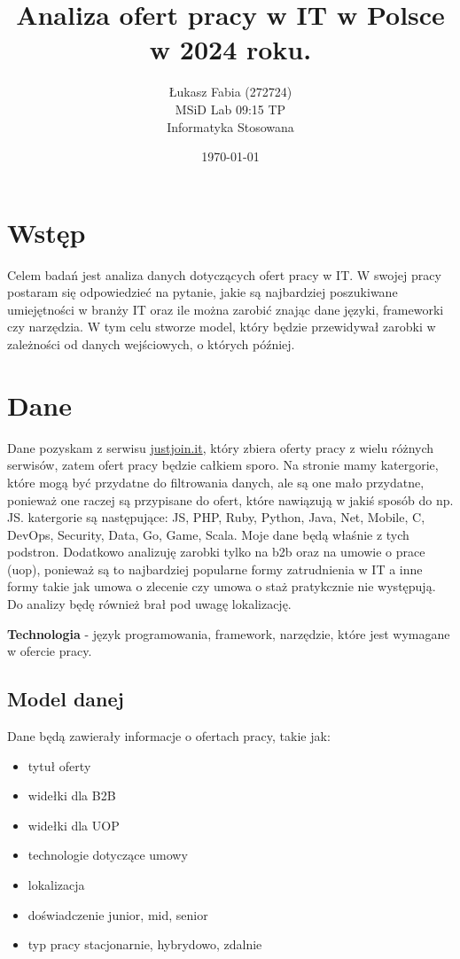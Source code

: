 \documentclass[a4paper]{article}
\title{Analiza ofert pracy w IT w Polsce w 2024 roku.}
\author{Łukasz Fabia (272724) \\ MSiD Lab 09:15 TP \\ Informatyka Stosowana}
\date{\today}
\begin{document}
\maketitle
\tableofcontents

\newpage

\section{Wstęp}

\quad Celem badań jest analiza danych dotyczących ofert pracy w IT. W swojej pracy postaram się
odpowiedzieć na pytanie, jakie są najbardziej poszukiwane umiejętności w branży IT oraz ile można zarobić
znając dane języki, frameworki czy narzędzia. W tym celu stworze model, który będzie przewidywał zarobki w zależności od danych wejściowych,
o których później.


\section{Dane}

\quad Dane pozyskam z serwisu \href{https://justjoin.it/}{justjoin.it}, który zbiera oferty pracy z wielu różnych serwisów, zatem
ofert pracy będzie całkiem sporo. Na stronie mamy katergorie, które mogą być przydatne do filtrowania danych, ale są one mało przydatne, ponieważ one raczej są przypisane do ofert, które nawiązują w jakiś sposób do np. JS. katergorie są następujące:
JS, PHP, Ruby, Python, Java, Net, Mobile, C, DevOps, Security, Data, Go, Game, Scala. Moje dane będą właśnie z tych podstron.
\quad Dodatkowo analizuję zarobki tylko na b2b oraz na umowie o prace (uop), ponieważ są to najbardziej popularne formy zatrudnienia w IT a inne formy takie jak umowa o zlecenie czy umowa o staż pratykcznie nie występują. Do analizy będę również brał pod uwagę lokalizację.

\textbf{\newline Technologia} - język programowania, framework, narzędzie, które jest wymagane w ofercie pracy.

\subsection{Model danej}
\quad Dane będą zawierały informacje o ofertach pracy, takie jak:
\begin{itemize}
    \item tytuł oferty
    \item widełki dla B2B
    \item widełki dla UOP
    \item technologie dotyczące umowy
    \item lokalizacja
    \item doświadczenie {junior, mid, senior}
    \item typ pracy {stacjonarnie, hybrydowo, zdalnie}
\end{itemize}
\end{document}
